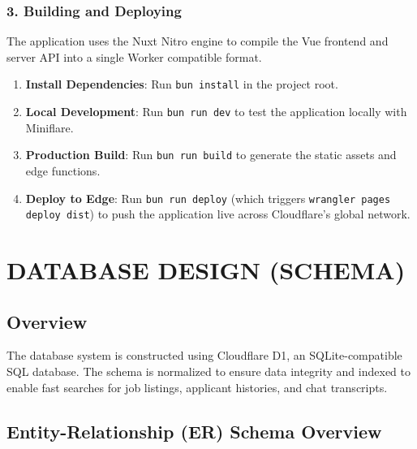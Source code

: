 \documentclass[12pt,a4paper]{report}
\begin{document}
\subsection{3. Building and Deploying}
The application uses the Nuxt Nitro engine to compile the Vue frontend and server API into a single Worker compatible format.
\begin{enumerate}[itemsep=0pt]
    \item \textbf{Install Dependencies}: Run \texttt{bun install} in the project root.
    \item \textbf{Local Development}: Run \texttt{bun run dev} to test the application locally with Miniflare.
    \item \textbf{Production Build}: Run \texttt{bun run build} to generate the static assets and edge functions.
    \item \textbf{Deploy to Edge}: Run \texttt{bun run deploy} (which triggers \texttt{wrangler pages deploy dist}) to push the application live across Cloudflare's global network.
\end{enumerate}


\chapter{DATABASE DESIGN (SCHEMA)}

\section{Overview}

The database system is constructed using Cloudflare D1, an SQLite-compatible SQL database. The schema is normalized to ensure data integrity and indexed to enable fast searches for job listings, applicant histories, and chat transcripts.

\section{Entity-Relationship (ER) Schema Overview}
\end{document}
